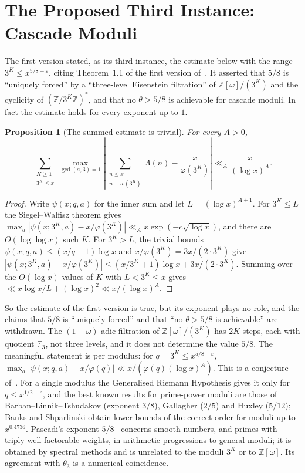 \documentclass[12pt]{amsart}
\theoremstyle{plain}
\newtheorem{proposition}[theorem]{Proposition}
\theoremstyle{definition}
\theoremstyle{remark}
\newcommand{\Z}{\mathbb{Z}}
\newcommand{\Zomega}{\Z[\omega]}
\begin{document}
\section{The Proposed Third Instance: Cascade Moduli}
\label{sec:cascade}

The first version stated, as its third instance, the estimate below with the
range $3^K \leq x^{5/8-\varepsilon}$, citing Theorem~1.1 of the first version
of~\cite{WakilEisenstein}. It asserted that $5/8$ is ``uniquely forced'' by a
``three-level Eisenstein filtration'' of $\Zomega/(3^K)$ and the cyclicity of
$(\Z/3^K\Z)^*$, and that no $\theta > 5/8$ is achievable for cascade moduli. In
fact the estimate holds for every exponent up to $1$.

\begin{proposition}[The summed estimate is trivial]
\label{prop:trivial-sum}
For every $A > 0$,
\[
  \sum_{\substack{K \geq 1 \\ 3^K \leq x}}
  \max_{\gcd(a,3)=1}
  \left| \sum_{\substack{n \leq x \\ n \equiv a\,(3^K)}} \Lambda(n)
    - \frac{x}{\varphi(3^K)} \right|
  \ll_A \frac{x}{(\log x)^A}.
\]
\end{proposition}

\begin{proof}
Write $\psi(x;q,a)$ for the inner sum and let $L = (\log x)^{A+1}$. For
$3^K \leq L$ the Siegel--Walfisz theorem gives
$\max_a |\psi(x;3^K,a) - x/\varphi(3^K)| \ll_A x\exp(-c\sqrt{\log x})$, and there
are $O(\log\log x)$ such $K$. For $3^K > L$, the trivial bounds
$\psi(x;q,a) \leq (x/q + 1)\log x$ and $x/\varphi(3^K) = 3x/(2 \cdot 3^K)$ give
$|\psi(x;3^K,a) - x/\varphi(3^K)| \leq (x/3^K + 1)\log x + 3x/(2 \cdot 3^K)$.
Summing over the $O(\log x)$ values of $K$ with $L < 3^K \leq x$ gives
$\ll x\log x/L + (\log x)^2 \ll x/(\log x)^A$.
\end{proof}

So the estimate of the first version is true, but its exponent plays no role,
and the claims that $5/8$ is ``uniquely forced'' and that ``no $\theta > 5/8$ is
achievable'' are withdrawn. The $(1-\omega)$-adic filtration of
$\Zomega/(3^K)$ has $2K$ steps, each with quotient $\mathbb{F}_3$, not three
levels, and it does not determine the value $5/8$. The meaningful statement is
per modulus: for $q = 3^K \leq x^{5/8-\varepsilon}$,
$\max_{a}|\psi(x;q,a) - x/\varphi(q)| \ll x/(\varphi(q)(\log x)^A)$. This is a
conjecture of~\cite{WakilEisenstein}. For a single modulus the Generalised
Riemann Hypothesis gives it only for $q \leq x^{1/2-\varepsilon}$, and the best
known results for prime-power moduli are those of Barban--Linnik--Tshudakov
(exponent $3/8$), Gallagher ($2/5$) and Huxley ($5/12$); Banks and Shparlinski
obtain lower bounds of the correct order for moduli up to $x^{0.4736}$.
Pascadi's exponent $5/8$~\cite{Pascadi2025} concerns smooth numbers, and primes
with triply-well-factorable weights, in arithmetic progressions to general
moduli; it is obtained by spectral methods and is unrelated to the moduli $3^K$
or to $\Zomega$. Its agreement with $\theta_3$ is a numerical coincidence.
\end{document}
